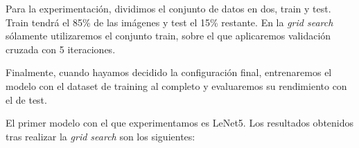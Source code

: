 
Para la experimentación, dividimos el conjunto de datos en dos, train y test. Train tendrá el 85\% de las imágenes y test el 15\% restante. En la \textit{grid search} sólamente utilizaremos el conjunto train, sobre el que aplicaremos validación cruzada con 5 iteraciones. 

Finalmente, cuando hayamos decidido la configuración final, entrenaremos el modelo con el dataset de training al completo y evaluaremos su rendimiento con el de test.

El primer modelo con el que experimentamos es LeNet5. Los resultados obtenidos tras realizar la \textit{grid search} son los siguientes:

